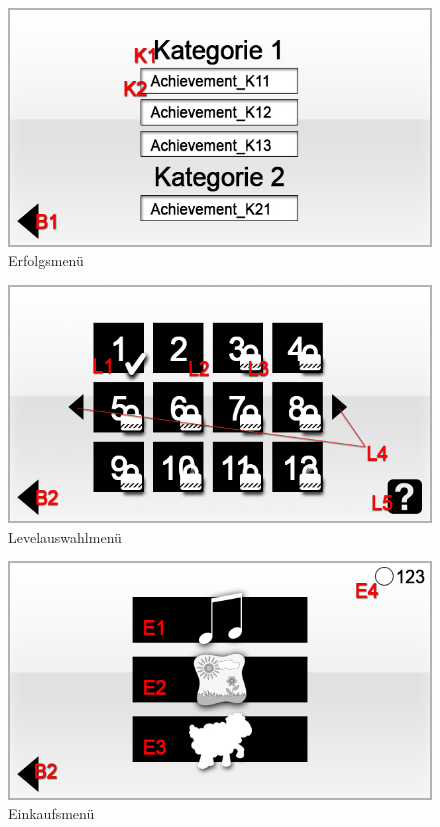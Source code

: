 \begin{figure}[H]
\centering
\includegraphics[scale=0.55]{../gui/_jpeg_numeration/achievements.jpg}
\caption{Erfolgsmenü}
\label{fig:Erfolgsmenu}
\end{figure}

\begin{figure}[H]
\centering
\includegraphics[scale=0.55]{../gui/_jpeg_numeration/level.jpg}
\caption{Levelauswahlmenü}
\label{fig:Levelauswahlmenu}
\end{figure}

\begin{figure}[H]
\centering
\includegraphics[scale=0.55]{../gui/_jpeg_numeration/shop.jpg}
\caption{Einkaufsmenü}
\label{fig:Einkaufsmenu}
\end{figure}

